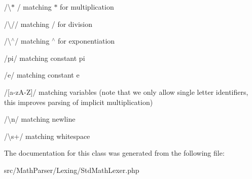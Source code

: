 \begin{DoxyItemize}
\item {\ttfamily /\textbackslash{}$\ast$ /} matching $\ast$ for multiplication
\item {\ttfamily /\textbackslash{}//} matching / for division
\item {\ttfamily /\textbackslash{}$^\wedge$/} matching $^\wedge$ for exponentiation
\item {\ttfamily /pi/} matching constant pi
\item {\ttfamily /e/} matching constant e
\item {\ttfamily /\mbox{[}a-\/z\-A-\/\-Z\mbox{]}/} matching variables (note that we only allow single letter identifiers, this improves parsing of implicit multiplication)
\item {\ttfamily /\textbackslash{}n/} matching newline
\item {\ttfamily /\textbackslash{}s+/} matching whitespace 
\end{DoxyItemize}

The documentation for this class was generated from the following file\-:\begin{DoxyCompactItemize}
\item 
src/\-Math\-Parser/\-Lexing/Std\-Math\-Lexer.\-php\end{DoxyCompactItemize}
